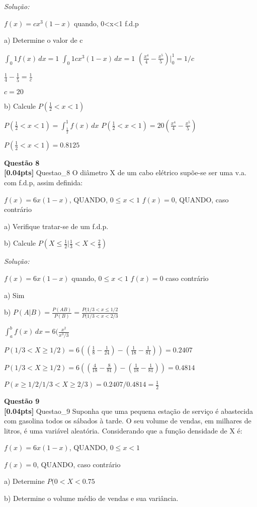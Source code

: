 \documentclass{article}
\newenvironment{problem}[2][Questão]
    { \begin{mdframed}[backgroundcolor=gray!20] \textbf{#1 #2} \\}
    {  \end{mdframed}}
\newenvironment{solution}
    {\textit{Solução:}}
    {}
\begin{document}
\begin{solution}

$f(x) = c x^{3}(1-x)$ quando, 0<x<1 f.d.p

a) Determine o valor de c

$\int_{0}{1} f(x) \, dx = 1$
$\int_{0}{1}  c x^{3}(1-x) \, dx = 1$
$(\frac{x^{4}}{4} - \frac{x^{5}}{5})|_{0}^{1} = 1/c$

$\frac{1}{4}-\frac{1}{5}=\frac{1}{c}$

$c=20$

b) Calcule $P(\frac{1}{2} < x < 1)$

$P(\frac{1}{2} < x < 1) = \int_{\frac{1}{2}}^{1} f(x) \,dx$
$P(\frac{1}{2} < x < 1) = 20 (\frac{x^{4}}{4} - \frac{x^{5}}{5})$

$P(\frac{1}{2} < x < 1) = 0.8125$

\end{solution}

\begin{problem}{8}
\textbf{[0.04pts]} Questao\_8 O diâmetro X de um cabo elétrico supõe-se ser uma v.a. com f.d.p, assim definida:

$f(x) = 6x(1-x)$, QUANDO, $0 \leq x < 1$
$f(x) = 0$, QUANDO, caso contrário

a) Verifique tratar-se de um f.d.p.

b)  Calcule $P(X \leq \frac{1}{2} | \frac{1}{3} < X < \frac{2}{3})$

\end{problem}

\begin{solution}

$f(x) = 6x(1-x)$ quando, $0 \leq x < 1$
$f(x) = 0$ caso contrário

a) Sim

b) $P(A|B) = \frac{P(AB)}{P(B)} = \frac{P(1/3 <x \leq 1/2}{P(1/3<x<2/3}$

$\int_{a}^{b} f(x) \,dx = 6 (\frac{x^{2}}{x^{3}/3}$

$P(1/3 < X \geq 1/2) = 6 ((\frac{1}{8} - \frac{1}{24}) -(\frac{1}{18} - \frac{1}{81})) = 0.2407 $

$P(1/3 < X \geq 1/2) = 6 ((\frac{4}{18} - \frac{8}{81}) -(\frac{1}{18} - \frac{1}{81})) = 0.4814 $

$P(x \geq 1/2 / 1/3 < X \geq 2/3) = 0.2407/0.4814 = \frac{1}{2}$

\end{solution}

\begin{problem}{9}
\textbf{[0.04pts]} Questao\_9 Suponha  que  uma  pequena  estação  de  serviço  é  abastecida  com  gasolina  todos  os 
sábados  à  tarde.  O  seu  volume  de  vendas,  em  milhares  de  litros,  é  uma  variável aleatória. Considerando que a função densidade de X é:

$f(x) = 6x(1-x)$, QUANDO, $0 \leq x < 1$

$f(x) = 0$, QUANDO, caso contrário

a) Determine $P(0 < X < 0.75$

b) Determine o volume médio de vendas e sua variância.

\end{problem}
\end{document}
